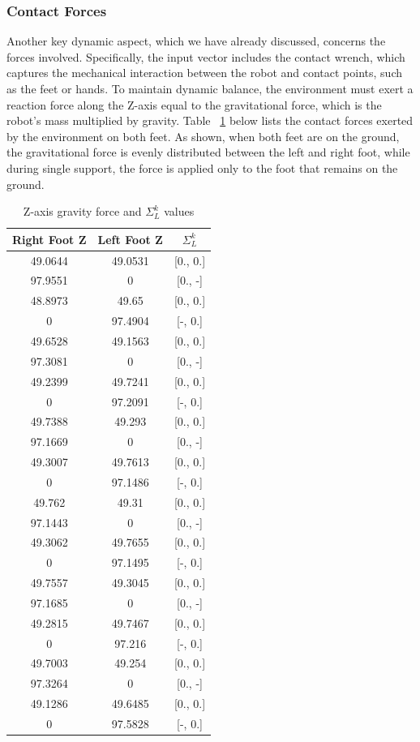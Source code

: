 \documentclass[main.tex]{subfiles}
\begin{document}
\subsubsection*{Contact Forces}
Another key dynamic aspect, which we have already discussed, concerns the forces involved. Specifically, the input vector includes the contact wrench, which captures the mechanical interaction between the robot and contact points, such as the feet or hands. To maintain dynamic balance, the environment must exert a reaction force along the Z-axis equal to the gravitational force, which is the robot's mass multiplied by gravity. Table ~\ref{tab:contactforceswalking} below lists the contact forces exerted by the environment on both feet. As shown, when both feet are on the ground, the gravitational force is evenly distributed between the left and right foot, while during single support, the force is applied only to the foot that remains on the ground.
\begin{table}[H]
\centering
\begin{tabular}{ccc}
\toprule
Right Foot Z & Left Foot Z & $\Sigma_L^k$ \\
\midrule
49.0644 & 49.0531 & [0., 0.] \\
97.9551 & 0 & [0., -] \\
48.8973 & 49.65 & [0., 0.] \\
0 & 97.4904 & [-, 0.] \\
49.6528 & 49.1563 & [0., 0.] \\
97.3081 & 0 & [0., -] \\
49.2399 & 49.7241 & [0., 0.] \\
0 & 97.2091 & [-, 0.] \\
49.7388 & 49.293 & [0., 0.] \\
97.1669 & 0 & [0., -] \\
49.3007 & 49.7613 & [0., 0.] \\
0 & 97.1486 & [-, 0.] \\
49.762 & 49.31 & [0., 0.] \\
97.1443 & 0 & [0., -] \\
49.3062 & 49.7655 & [0., 0.] \\
0 & 97.1495 & [-, 0.] \\
49.7557 & 49.3045 & [0., 0.] \\
97.1685 & 0 & [0., -] \\
49.2815 & 49.7467 & [0., 0.] \\
0 & 97.216 & [-, 0.] \\
49.7003 & 49.254 & [0., 0.] \\
97.3264 & 0 & [0., -] \\
49.1286 & 49.6485 & [0., 0.] \\
0 & 97.5828 & [-, 0.] \\
\bottomrule
\end{tabular}
\caption{Z-axis gravity force and $\Sigma_L^k$ values}
\label{tab:contactforceswalking}

\end{table}
\end{document}
